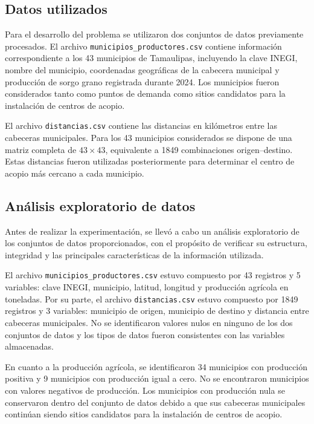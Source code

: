 \documentclass[journal]{IEEEtran}
\begin{document}
\subsection{Datos utilizados}

Para el desarrollo del problema se utilizaron dos conjuntos de datos previamente procesados. El archivo \texttt{municipios\_productores.csv} contiene información correspondiente a los 43 municipios de Tamaulipas, incluyendo la clave INEGI, nombre del municipio, coordenadas geográficas de la cabecera municipal y producción de sorgo grano registrada durante 2024. Los municipios fueron considerados tanto como puntos de demanda como sitios candidatos para la instalación de centros de acopio.

El archivo \texttt{distancias.csv} contiene las distancias en kilómetros entre las cabeceras municipales. Para los 43 municipios considerados se dispone de una matriz completa de $43 \times 43$, equivalente a 1849 combinaciones origen--destino. Estas distancias fueron utilizadas posteriormente para determinar el centro de acopio más cercano a cada municipio.

\subsection{Análisis exploratorio de datos}

Antes de realizar la experimentación, se llevó a cabo un análisis exploratorio de los conjuntos de datos proporcionados, con el propósito de verificar su estructura, integridad y las principales características de la información utilizada.

El archivo \texttt{municipios\_productores.csv} estuvo compuesto por 43 registros y 5 variables: clave INEGI, municipio, latitud, longitud y producción agrícola en toneladas. Por su parte, el archivo \texttt{distancias.csv} estuvo compuesto por 1849 registros y 3 variables: municipio de origen, municipio de destino y distancia entre cabeceras municipales. No se identificaron valores nulos en ninguno de los dos conjuntos de datos y los tipos de datos fueron consistentes con las variables almacenadas.

En cuanto a la producción agrícola, se identificaron 34 municipios con producción positiva y 9 municipios con producción igual a cero. No se encontraron municipios con valores negativos de producción. Los municipios con producción nula se conservaron dentro del conjunto de datos debido a que sus cabeceras municipales continúan siendo sitios candidatos para la instalación de centros de acopio.
\end{document}
